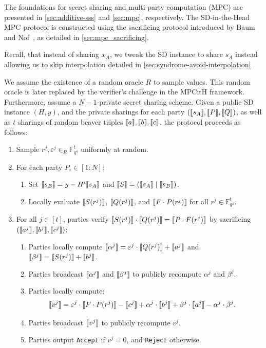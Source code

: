 \documentclass[11pt]{report}
\theoremstyle{definition}
\theoremstyle{plain}
\begin{document}
The foundations for secret sharing and multi-party computation (MPC) are presented in \autoref{sec:additive-sss} and \autoref{sec:mpc}, respectively. The SD-in-the-Head MPC protocol is constructed using the sacrificing protocol introduced by Baum and Nof~\cite{baum2020concretely}, as detailed in \cref{sec:mpc_sacrificing}.

Recall, that instead of sharing $x_A$, we tweak the SD instance to share $s_A$ instead allowing us to skip interpolation detailed in \autoref{sec:syndrome-avoid-interpolation}

\begin{protocol}\label{def:sdith-mpc}
  We assume the existence of a random oracle $R$ to sample values. This random oracle is later replaced by the verifier's challenge in the MPCitH framework. Furthermore, assume a $N-1$-private secret sharing scheme. Given a public SD instance $(H, y)$, and the private sharings for each party $(\llbracket s_A \rrbracket, \llbracket P \rrbracket, \llbracket Q \rrbracket)$, as well as $t$ sharings of random beaver triples $\llbracket a \rrbracket, \llbracket b \rrbracket, \llbracket c \rrbracket$, the protocol proceeds as follows:
  \begin{enumerate}
    \item Sample $r^j, \varepsilon^j \in_R \mathbb{F}_{q^4}^t$ uniformly at random.
    \item For each party $P_i \in [1 : N]$:
          \begin{enumerate}
            \item Set $\llbracket s_B \rrbracket = y - H' \llbracket s_A \rrbracket$ and $\llbracket S \rrbracket = (\llbracket s_A \rrbracket \mid \llbracket s_B \rrbracket)$.\label{step:sdith-mpc-lagrange-interpolation}
            \item Locally evaluate $\llbracket S(r^j) \rrbracket$, $\llbracket Q(r^j) \rrbracket$, and $\llbracket F \cdot P(r^j) \rrbracket$ for all $r^j \in \mathbb{F}_{q^4}^t$.
          \end{enumerate}
    \item For all $j \in [t]$, parties verify $\llbracket S(r^j) \rrbracket \cdot \llbracket Q(r^j) \rrbracket = \llbracket P \cdot F(r^j) \rrbracket$ by sacrificing \\$(\llbracket a^j \rrbracket, \llbracket b^j \rrbracket, \llbracket c^j \rrbracket)$:
          \begin{enumerate}[topsep=0pt]
            \item Parties locally compute $\llbracket \alpha^j \rrbracket  = \varepsilon^j \cdot \llbracket Q(r^j) \rrbracket + \llbracket a^j \rrbracket$ and $ \llbracket \beta^j \rrbracket  = \llbracket S(r^j) \rrbracket + \llbracket b^j \rrbracket$.
            \item Parties broadcast $\llbracket \alpha^j \rrbracket$ and $\llbracket \beta^j \rrbracket$ to publicly recompute $\alpha^j$ and $\beta^j$.
            \item Parties locally compute:
                  \begin{align*}
                    \llbracket v^j \rrbracket & = \varepsilon^j \cdot \llbracket F \cdot P(r^j) \rrbracket - \llbracket c^j \rrbracket + \alpha^j \cdot \llbracket b^j \rrbracket + \beta^j \cdot \llbracket a^j \rrbracket - \alpha^j \cdot \beta^j.
                  \end{align*}
            \item Parties broadcast $\llbracket v^j \rrbracket$ to publicly recompute $v^j$.
            \item Parties output \texttt{Accept} if $v^j = 0$, and \texttt{Reject} otherwise.
          \end{enumerate}
  \end{enumerate}
\end{protocol}
\end{document}
